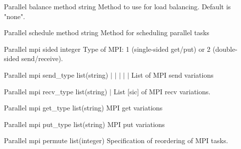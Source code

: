 \documentclass{article}
\begin{document}
\Parameter
{Parallel}
{balance}
{method}
{string}
{}
{Method to use for load balancing. Default is "none".}
{}
{}

\Parameter
{Parallel}
{schedule}
{method}
{string}
{}
{Method for scheduling parallel tasks}
{}
{}

\Parameter
{Parallel}
{mpi}
{sided}
{integer}
{}
{Type of MPI: 1 (single-sided get/put) or 2 (double-sided send/receive). }
{}
{}

\Parameter
{Parallel}
{mpi}
{send\_type}
{list(string)}
{  $|$  $|$  $|$  $|$  $|$ }
{List of MPI send variations}
{}
{}

\Parameter
{Parallel}
{mpi}
{recv\_type}
{list(string)} 	
{ $|$ }
{List [sic] of MPI recv variations.} 
{}
{}

\Parameter
{Parallel}
{mpi}
{get\_type}
{list(string)}
{}
{MPI get variations}
{}
{}

\Parameter
{Parallel}
{mpi}
{put\_type}
{list(string)}
{}
{MPI put variations}
{}
{}

\Parameter
{Parallel}
{mpi}
{permute}
{list(integer)}
{}
{Specification of reordering of MPI tasks. }
{}
{}

\end{document}
